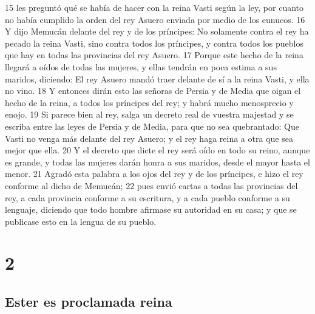 15 les preguntó qué se había de hacer con la reina Vasti según la ley, por cuanto no había cumplido la orden del rey Asuero enviada por medio de los eunucos.
16 Y dijo Memucán delante del rey y de los príncipes: No solamente contra el rey ha pecado la reina Vasti, sino contra todos los príncipes, y contra todos los pueblos que hay en todas las provincias del rey Asuero.
17 Porque este hecho de la reina llegará a oídos de todas las mujeres, y ellas tendrán en poca estima a sus maridos, diciendo: El rey Asuero mandó traer delante de sí a la reina Vasti, y ella no vino.
18 Y entonces dirán esto las señoras de Persia y de Media que oigan el hecho de la reina, a todos los príncipes del rey; y habrá mucho menosprecio y enojo.
19 Si parece bien al rey, salga un decreto real de vuestra majestad y se escriba entre las leyes de Persia y de Media, para que no sea quebrantado: Que Vasti no venga más delante del rey Asuero; y el rey haga reina a otra que sea mejor que ella.
20 Y el decreto que dicte el rey será oído en todo su reino, aunque es grande, y todas las mujeres darán honra a sus maridos, desde el mayor hasta el menor.
21 Agradó esta palabra a los ojos del rey y de los príncipes, e hizo el rey conforme al dicho de Memucán;
22 pues envió cartas a todas las provincias del rey, a cada provincia conforme a su escritura, y a cada pueblo conforme a su lenguaje, diciendo que todo hombre afirmase su autoridad en su casa; y que se publicase esto en la lengua de su pueblo.

\chapter{2}

\section*{Ester es proclamada reina}



